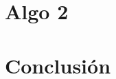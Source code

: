 \documentclass{udpreport}
\begin{document}
\chapter{Algo 2}
    

     
 \newpage

    
    
\chapter{Conclusión}
      
\end{document}
